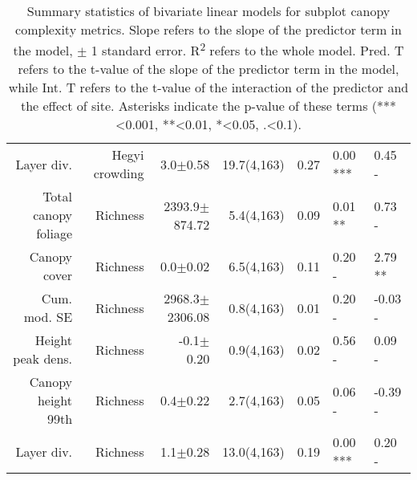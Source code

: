 \begin{table}[H]
\begin{tabular}{rrrrrll}
  Layer div. & Hegyi crowding & 3.0$\pm$0.58 & 19.7(4,163) & 0.27 & 0.00 *** & 0.45 - \\ 
  Total canopy foliage & Richness & 2393.9$\pm$874.72 & 5.4(4,163) & 0.09 & 0.01 ** & 0.73 - \\ 
  Canopy cover & Richness & 0.0$\pm$0.02 & 6.5(4,163) & 0.11 & 0.20 - & 2.79 ** \\ 
  Cum. mod. SE & Richness & 2968.3$\pm$2306.08 & 0.8(4,163) & 0.01 & 0.20 - & -0.03 - \\ 
  Height peak dens. & Richness & -0.1$\pm$0.20 & 0.9(4,163) & 0.02 & 0.56 - & 0.09 - \\ 
  Canopy height 99th & Richness & 0.4$\pm$0.22 & 2.7(4,163) & 0.05 & 0.06 - & -0.39 - \\ 
  Layer div. & Richness & 1.1$\pm$0.28 & 13.0(4,163) & 0.19 & 0.00 *** & 0.20 - \\ 
   \hline
\end{tabular}
\caption{Summary statistics of bivariate linear models for subplot canopy complexity metrics. Slope refers to the slope of the predictor term in the model, $\pm{}$ 1 standard error. R\textsuperscript{2} refers to the whole model. Pred. T refers to the t-value of the slope of the predictor term in the model, while Int. T refers to the t-value of the interaction of the predictor and the effect of site. Asterisks indicate the p-value of these terms (***<0.001, **<0.01, *<0.05, .<0.1).} 
\label{mod_bivar_lm_summ}
\end{table}

